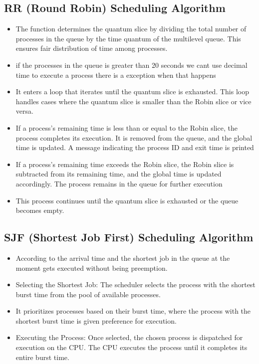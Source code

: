 \documentclass{article}
\begin{document}
\subsection{RR (Round Robin) Scheduling Algorithm}
\begin{itemize}
    \item The function determines the quantum slice by dividing the total number of processes in the queue by the time quantum of the multilevel queue. This ensures fair distribution of time among processes.
    \item if the processes in the queue is greater than 20 seconds we cant use decimal time to execute a process there is a exception when that happens
    \item It enters a loop that iterates until the quantum slice is exhausted. This loop handles cases where the quantum slice is smaller than the Robin slice or vice versa.
    \item If a process's remaining time is less than or equal to the Robin slice, the process completes its execution. It is removed from the queue, and the global time is updated. A message indicating the process ID and exit time is printed
    \item If a process's remaining time exceeds the Robin slice, the Robin slice is subtracted from its remaining time, and the global time is updated accordingly. The process remains in the queue for further execution
    \item This process continues until the quantum slice is exhausted or the queue becomes empty.
\end{itemize}

\vspace{\baselineskip}
\subsection{SJF (Shortest Job First) Scheduling Algorithm}
\begin{itemize}
    \item According to the arrival time and the shortest job in the queue at the moment gets executed without being preemption.
    \item Selecting the Shortest Job: The scheduler selects the process with the shortest burst time from the pool of available processes.
    \item It prioritizes processes based on their burst time, where the process with the shortest burst time is given preference for execution.
    \item Executing the Process: Once selected, the chosen process is dispatched for execution on the CPU. The CPU executes the process until it completes its entire burst time.
\end{itemize}
\vspace{\baselineskip}
\end{document}
